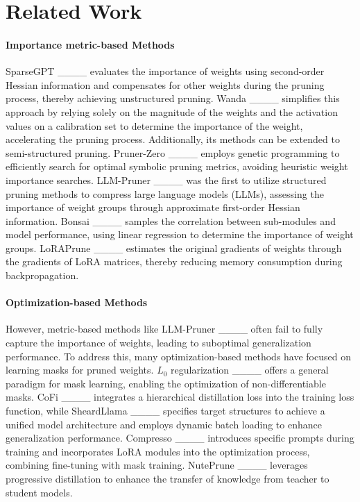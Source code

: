 \section{Related Work}
\paragraph{Importance metric-based Methods}SparseGPT ____ evaluates the importance of weights using second-order Hessian information and compensates for other weights during the pruning process, thereby achieving unstructured pruning. Wanda ____ simplifies this approach by relying solely on the magnitude of the weights and the activation values on a calibration set to determine the importance of the weight, accelerating the pruning process. Additionally, its methods can be extended to semi-structured pruning. Pruner-Zero ____ employs genetic programming to efficiently search for optimal symbolic pruning metrics, avoiding heuristic weight importance searches. LLM-Pruner ____ was the first to utilize structured pruning methods to compress large language models (LLMs), assessing the importance of weight groups through approximate first-order Hessian information. Bonsai ____ samples the correlation between sub-modules and model performance, using linear regression to determine the importance of weight groups. LoRAPrune ____ estimates the original gradients of weights through the gradients of LoRA matrices, thereby reducing memory consumption during backpropagation.

\paragraph{Optimization-based Methods}However, metric-based methods like LLM-Pruner ____ often fail to fully capture the importance of weights, leading to suboptimal generalization performance. To address this, many optimization-based methods have focused on learning masks for pruned weights. $L_0$ regularization ____ offers a general paradigm for mask learning, enabling the optimization of non-differentiable masks. CoFi ____ integrates a hierarchical distillation loss into the training loss function, while SheardLlama ____ specifies target structures to achieve a unified model architecture and employs dynamic batch loading to enhance generalization performance. Compresso ____ introduces specific prompts during training and incorporates LoRA modules into the optimization process, combining fine-tuning with mask training. NutePrune ____ leverages progressive distillation to enhance the transfer of knowledge from teacher to student models.